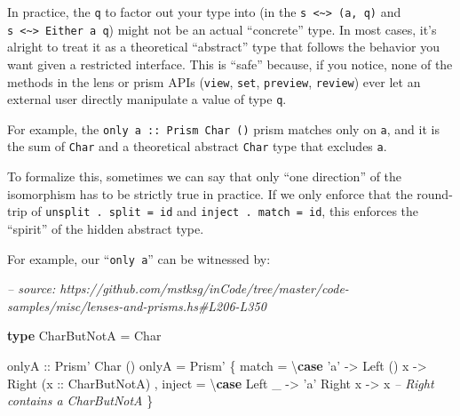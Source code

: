 \documentclass[]{article}
\newenvironment{Shaded}{}{}
\newcommand{\CharTok}[1]{\textcolor[rgb]{0.25,0.44,0.63}{#1}}
\newcommand{\CommentTok}[1]{\textcolor[rgb]{0.38,0.63,0.69}{\textit{#1}}}
\newcommand{\DataTypeTok}[1]{\textcolor[rgb]{0.56,0.13,0.00}{#1}}
\newcommand{\FunctionTok}[1]{\textcolor[rgb]{0.02,0.16,0.49}{#1}}
\newcommand{\KeywordTok}[1]{\textcolor[rgb]{0.00,0.44,0.13}{\textbf{#1}}}
\newcommand{\NormalTok}[1]{#1}
\newcommand{\OtherTok}[1]{\textcolor[rgb]{0.00,0.44,0.13}{#1}}
\begin{document}
In practice, the \texttt{q} to factor out your type into (in the
\texttt{s\ \textless{}\textasciitilde{}\textgreater{}\ (a,\ q)} and
\texttt{s\ \textless{}\textasciitilde{}\textgreater{}\ Either\ a\ q}) might not
be an actual ``concrete'' type. In most cases, it's alright to treat it as a
theoretical ``abstract'' type that follows the behavior you want given a
restricted interface. This is ``safe'' because, if you notice, none of the
methods in the lens or prism APIs (\texttt{view}, \texttt{set},
\texttt{preview}, \texttt{review}) ever let an external user directly manipulate
a value of type \texttt{q}.

For example, the
\texttt{only\ \textquotesingle{}a\textquotesingle{}\ ::\ Prism\textquotesingle{}\ Char\ ()}
prism matches only on \texttt{\textquotesingle{}a\textquotesingle{}}, and it is
the sum of \texttt{Char} and a theoretical abstract \texttt{Char} type that
excludes \texttt{\textquotesingle{}a\textquotesingle{}}.

To formalize this, sometimes we can say that only ``one direction'' of the
isomorphism has to be strictly true in practice. If we only enforce that the
round-trip of \texttt{unsplit\ .\ split\ =\ id} and
\texttt{inject\ .\ match\ =\ id}, this enforces the ``spirit'' of the hidden
abstract type.

For example, our ``\texttt{only\ \textquotesingle{}a\textquotesingle{}}'' can be
witnessed by:

\begin{Shaded}
\begin{Highlighting}[]
\CommentTok{-- source: https://github.com/mstksg/inCode/tree/master/code-samples/misc/lenses-and-prisms.hs#L206-L350}

\KeywordTok{type} \DataTypeTok{CharButNotA} \FunctionTok{=} \DataTypeTok{Char}

\OtherTok{onlyA ::} \DataTypeTok{Prism'} \DataTypeTok{Char}\NormalTok{ ()}
\NormalTok{onlyA }\FunctionTok{=} \DataTypeTok{Prism'}
\NormalTok{    \{ match  }\FunctionTok{=}\NormalTok{ \textbackslash{}}\KeywordTok{case}
        \CharTok{'a'} \OtherTok{->} \DataTypeTok{Left}\NormalTok{ ()}
\NormalTok{        x   }\OtherTok{->} \DataTypeTok{Right}\NormalTok{ (}\OtherTok{x ::} \DataTypeTok{CharButNotA}\NormalTok{)}
\NormalTok{    , inject }\FunctionTok{=}\NormalTok{ \textbackslash{}}\KeywordTok{case}
        \DataTypeTok{Left}\NormalTok{  _ }\OtherTok{->} \CharTok{'a'}
        \DataTypeTok{Right}\NormalTok{ x }\OtherTok{->}\NormalTok{ x        }\CommentTok{-- Right contains a CharButNotA}
\NormalTok{    \}}
\end{Highlighting}
\end{Shaded}
\end{document}
